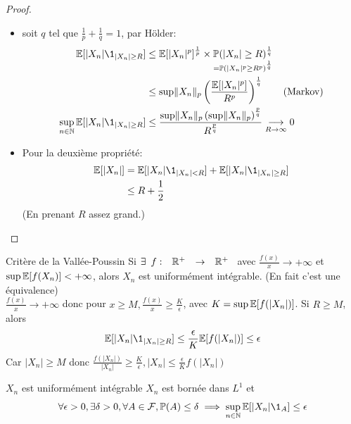 \documentclass[]{report}
\begin{document}
    \begin{proof}
        \begin{itemize}
        \item soit $q$ tel que $\frac{1}{p}+\frac{1}{q}=1$, par Hölder:
            \begin{align*}
                \Ea[|X_n|\1_{|X_n|\ge R}]&\le \Ea[|X_n|^p]^{\frac{1}{p}}\times \underset{=\Pa(|X_n|^p\ge R^p)^{\frac{1}{q}}}{\Pa(|X_n|\ge R)^{\frac{1}{q}}}\\
                &\le\sup \norme{X_n}_p \left(\frac{\Ea[|X_n|^p]}{R^p}\right)^{\frac{1}{q}}\qquad \text{(Markov)}\\
                \sup_{n\in \N}\Ea[|X_n|\1_{|X_n|\ge R}]&\le \frac{\sup \norme{X_n}_p \left(\sup \norme{X_n}_p\right)^{\frac{p}{q}}}{R^{\frac{p}{q}}}\underset{R\to \infty}{\longrightarrow}0
            \end{align*}
        \item Pour la deuxième propriété:
            \begin{align*}
                \Ea[|X_n|]&=\Ea[|X_n|\1_{|X_n|<R}]+\Ea[|X_n|\1_{|X_n|\ge R}]\\
                &\le R+\frac{1}{2}
            \end{align*}
            (En prenant $R$ assez grand.)
        \end{itemize}
    \end{proof}

    \begin{re}{Critère de la Vallée-Poussin}{}
        Si $\exists\begin{array}{ccccc} f : & \mathbb{R}^+ & \to & \mathbb{R}^+ \end{array}$ avec $\frac{f(x)}{x}\to +\infty$ et $\sup\mathbb{E}[f(X_n)]<+\infty$, alors $X_n$ est uniformément intégrable. (En fait c'est une équivalence)\\
        $\frac{f(x)}{x}\to +\infty$ donc pour $x\ge M,\frac{f(x)}{x}\ge \frac{K}{\epsilon}$, avec $K=\sup\mathbb{E}[f(|X_n|)]$. Si $R\ge M$, alors
        \[\Ea[|X_n|\1_{|X_n|\ge R}]\le \frac{\epsilon}{K} \Ea[f(|X_n|)]\le \epsilon\]
        Car $|X_n|\ge M$ donc $\frac{f(|X_n|)}{|X_n|}\ge \frac{K}{\epsilon},|X_n|\le \frac{\epsilon}{K}f(|X_n|)$
    \end{re}

    \begin{prop}{}{}
        $X_n$ est uniformément intégrable \ssi $X_n$ est bornée dans $L^1$ et
        \[\forall \epsilon>0,\exists \delta> 0,\forall A\in \Fr,\Pa(A)\le \delta\implies \sup_{n\in \N}\Ea[|X_n|\1_A]\le \epsilon\]
    \end{prop}
\end{document}
